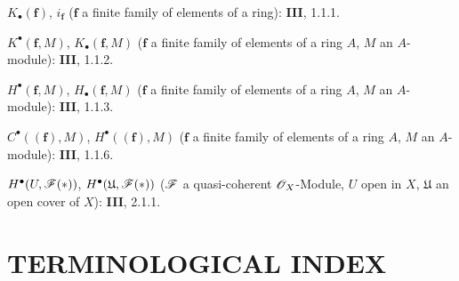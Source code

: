 \begin{flushleft}
$K_\bullet(\mathbf f)$, $i_{\mathbf f}$ ($\mathbf f$ a finite family of
elements of a ring): \textbf{III}, 1.1.1.

$K^\bullet(\mathbf f,M)$, $K_\bullet(\mathbf f,M)$ ($\mathbf f$ a finite
family of elements of a ring $A$, $M$ an $A$-module): \textbf{III}, 1.1.2.

$H^\bullet(\mathbf f,M)$, $H_\bullet(\mathbf f,M)$ ($\mathbf f$ a finite
family of elements of a ring $A$, $M$ an $A$-module): \textbf{III}, 1.1.3.

$C^\bullet((\mathbf f),M)$, $H^\bullet((\mathbf f),M)$ ($\mathbf f$ a
finite family of elements of a ring $A$, $M$ an $A$-module): \textbf{III}, 1.1.6.

$H^\bullet(U,\mathscr{F}(*))$,
$H^\bullet(\mathfrak U,\mathscr{F}(*))$ ($\mathscr{F}$ a quasi-coherent
$\mathscr{O}_X$-Module, $U$ open in $X$, $\mathfrak U$ an open cover of $X$):
\textbf{III}, 2.1.1.
\end{flushleft}

\clearpage
{}
\section*{TERMINOLOGICAL INDEX}

